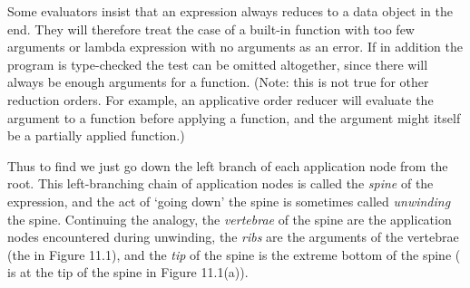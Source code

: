 
Some evaluators insist that an expression always reduces to a data object in
the end. They will therefore treat the case of a built-in function with too few
arguments or lambda expression with no arguments as an error. If in addition
the program is type-checked the test can be omitted altogether, since there
will always be enough arguments for a function. (Note: this is not true for
other reduction orders. For example, an applicative order reducer will
evaluate the argument to a function before applying a function, and the
argument might itself be a partially applied function.)

Thus to find  we just go down the left branch of each application node from
the root. This left-branching chain of application nodes is called the \textit{spine} of
the expression, and the act of `going down' the spine is sometimes called
\textit{unwinding} the spine. Continuing the analogy, the \textit{vertebrae} of the spine are
the application nodes encountered during unwinding, the \textit{ribs} are the
arguments of the vertebrae (the  in Figure 11.1), and the \textit{tip} of the spine is
the extreme bottom of the spine ( is at the tip of the spine in Figure 11.1(a)).


